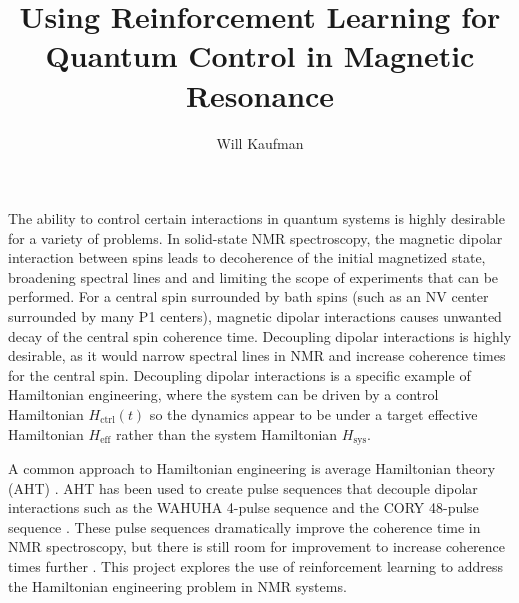 \documentclass{article}
\title{Using Reinforcement Learning for Quantum Control in Magnetic Resonance}
\author{Will Kaufman}
\begin{document}
\maketitle

The ability to control certain interactions in quantum systems is highly desirable for a variety of problems. In solid-state NMR spectroscopy, the magnetic dipolar interaction between spins leads to decoherence of the initial magnetized state, broadening spectral lines and and limiting the scope of experiments that can be performed. For a central spin surrounded by bath spins (such as an NV center surrounded by many P1 centers),
magnetic dipolar interactions causes unwanted decay of the central spin coherence time. Decoupling dipolar interactions is highly desirable, as it would narrow spectral lines in NMR and increase coherence times for the central spin. Decoupling dipolar interactions is a specific example of Hamiltonian engineering, where the system can be driven by a control Hamiltonian $H_{\text{ctrl}}(t)$ so the dynamics appear to be under a target effective Hamiltonian $H_{\text{eff}}$ rather than the system Hamiltonian $H_{\text{sys}}$.

A common approach to Hamiltonian engineering is average Hamiltonian theory (AHT) \cite{1976ii, gerstein-dybowski}.
AHT has been used to create pulse sequences that decouple dipolar interactions such as the WAHUHA 4-pulse sequence \cite{PhysRevLett.20.180} and the CORY 48-pulse sequence \cite{CORY1990205}.
These pulse sequences dramatically improve the coherence time in NMR spectroscopy, but there is still room for improvement to increase coherence times further%
.
This project explores the use of reinforcement learning to address the Hamiltonian engineering problem in NMR systems.

\end{document}
